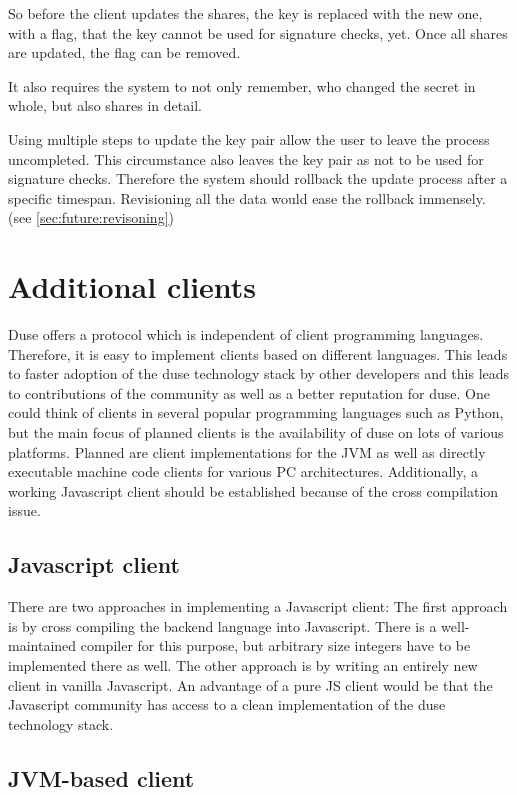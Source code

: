So before the client updates the shares, the key is replaced with the new one,
with a flag, that the key cannot be used for signature checks, yet. Once all
shares are updated, the flag can be removed.

It also requires the system to not only remember, who changed the secret in
whole, but also shares in detail.

Using multiple steps to update the key pair allow the user to leave the process
uncompleted. This circumstance also leaves the key pair as not to be used for
signature checks. Therefore the system should rollback the update process after
a specific timespan. Revisioning all the data would ease the rollback
immensely. (see \ref{sec:future:revisoning})

\section{Additional clients}

Duse offers a protocol which is independent of client programming languages.
Therefore, it is easy to implement clients based on different
languages. This leads to faster adoption of the duse technology stack by
other developers and this leads to contributions of the community as well
as a better reputation for duse. One could think of clients in several
popular programming languages such as Python, but the main focus of planned
clients is the availability of duse on lots of various platforms.
Planned are client implementations for the JVM as well as directly executable
machine code clients for various PC architectures. Additionally, a working
Javascript client should be established because of the cross compilation issue.

\subsection{Javascript client}

There are two approaches in implementing a Javascript client: The first
approach is by cross compiling the backend language into Javascript. There
is a well-maintained compiler for this purpose, but arbitrary size integers
have to be implemented there as well. The other approach is by writing
an entirely new client in vanilla Javascript. An advantage of a pure JS
client would be that the Javascript community has access to a clean
implementation of the duse technology stack.

\subsection{JVM-based client}

